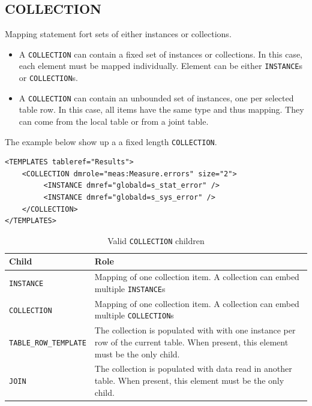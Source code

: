 \documentclass[11pt,a4paper]{ivoa}
\begin{document}
%
%
\clearpage
\subsection{COLLECTION}
Mapping statement fort sets of either instances or collections.

\begin{itemize}
    \item A \texttt{COLLECTION} can contain a fixed set of instances or collections. 
            In this case, each element must be mapped individually.  
            Element can be either \texttt{INSTANCE}s or \texttt{COLLECTION}s.
    \item A \texttt{COLLECTION} can contain an unbounded set of instances, one per selected table row. 
            In this case, all items have the same type and thus mapping. 
           They can come from the local table or from a joint table.
 \end{itemize}

The example below show up a a fixed length \texttt{COLLECTION}.

\begin{lstlisting}[caption={\texttt{COLLECTION} example},style=XML]
<TEMPLATES tableref="Results">
    <COLLECTION dmrole="meas:Measure.errors" size="2">
         <INSTANCE dmref="globald=s_stat_error" />         
         <INSTANCE dmref="globald=s_sys_error" />
    </COLLECTION>
</TEMPLATES>
\end{lstlisting}

\begin{table}[!hbtp]
\small
\centering
\begin{tabulary}{\linewidth}{|L|J|}
       \hline 
           \textbf{Child} &
           \textbf{Role}\\
       \hline  \hline
           \texttt{INSTANCE}    & 
           Mapping of one collection item. A collection can embed multiple \texttt{INSTANCE}s \\              
       \hline  
           \texttt{COLLECTION}    & 
           Mapping of one collection item. A collection can embed multiple \texttt{COLLECTION}s \\              
       \hline  
           \texttt{TABLE\_ROW\_TEMPLATE}    & 
          The collection is populated with with one instance per row of the current table. When present, this element must be the only child. \\       
       \hline  
          \texttt{JOIN}    & 
         The collection is populated with data read in another table. When present, this element must be the only child.\\      
       \hline 
\end{tabulary}
\caption{Valid  \texttt{COLLECTION} children} 
\label{tbl:coll-children}
\end{table}
\end{document}
